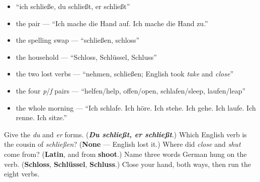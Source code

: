 \begin{itemize}
\raggedright
  \item \textquotedblleft{}ich schließe, du schließt, er schließt\textquotedblright{}
  \item the pair — \textquotedblleft{}Ich mache die Hand auf. Ich mache die Hand zu.\textquotedblright{}
  \item the spelling swap — \textquotedblleft{}schließen, schloss\textquotedblright{}
  \item the household — \textquotedblleft{}Schloss, Schlüssel, Schluss\textquotedblright{}
  \item the two lost verbs — \textquotedblleft{}nehmen, schließen; English took \emph{take} and \emph{close}\textquotedblright{}
  \item the four \emph{p}/\emph{f} pairs — \textquotedblleft{}helfen/help, offen/open, schlafen/sleep, laufen/leap\textquotedblright{}
  \item the whole morning — \textquotedblleft{}Ich schlafe. Ich höre. Ich stehe. Ich gehe. Ich laufe. Ich renne. Ich sitze.\textquotedblright{}
\end{itemize}

\begin{tcolorbox}[breakable,colback=teal!4,colframe=teal!35!black,title={Before you move on}]
Give the \emph{du} and \emph{er} forms. (\emph{\textbf{Du schließt, er schließt}}.) Which English verb is the cousin of \emph{schließen}? (\textbf{None} — English lost it.) Where did \emph{close} and \emph{shut} come from? (\textbf{Latin}, and from \textbf{shoot}.) Name three words German hung on the verb. (\textbf{Schloss}, \textbf{Schlüssel}, \textbf{Schluss}.) Close your hand, both ways, then run the eight verbs.
\end{tcolorbox}
